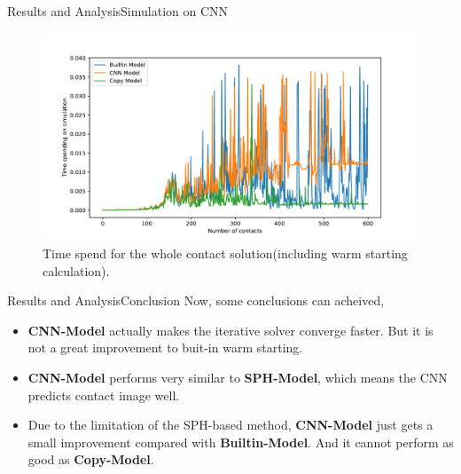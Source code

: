 \documentclass{beamer}
\begin{document}
\begin{frame}{Results and Analysis}{Simulation on CNN}
\begin{figure}[!h]
        \centering
            \includegraphics[scale = 0.4]{../report/Figures/cnntotal}
            \caption{Time spend for the whole contact solution(including warm starting calculation).}
\end{figure}
\end{frame}

\begin{frame}{Results and Analysis}{Conclusion}
Now, some conclusions can acheived,
\pause
\begin{itemize}
    \item \textbf{CNN-Model} actually makes the iterative solver converge faster. But it is not a great improvement to buit-in warm starting.
    \pause
    \item \textbf{CNN-Model} performs very similar to \textbf{SPH-Model}, which means the CNN predicts contact image well.
    \pause
    \item Due to the limitation of the SPH-based method, \textbf{CNN-Model} just gets a small improvement compared with \textbf{Builtin-Model}. And it cannot perform as good as \textbf{Copy-Model}.
\end{itemize}
\end{frame}
\end{document}
